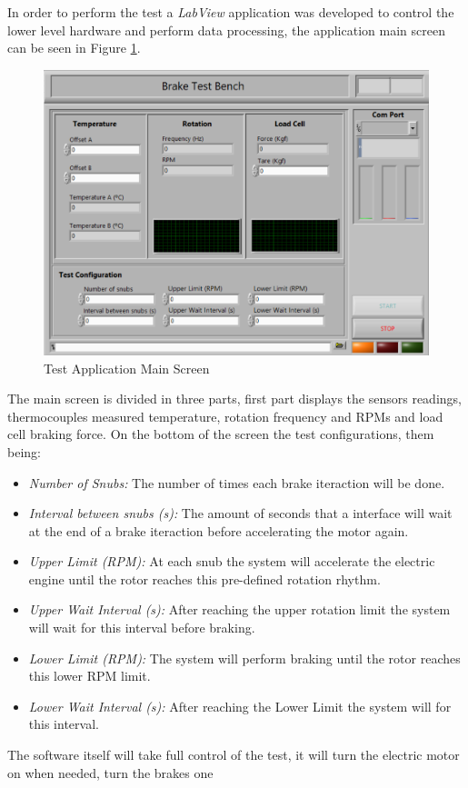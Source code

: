 \label{ssec:testApplication}
	In order to perform the test a \textit{LabView} application was developed to control the lower level hardware and perform data processing, the application main screen can be seen in Figure \ref{fig:labview-app-mainscreen}.

	\begin{figure}[htbp]
		\centering
		\includegraphics[scale=0.7]{figuras/fig-labview-app-mainscreen}
		\caption{Test Application Main Screen}
		\label{fig:labview-app-mainscreen}
	\end{figure}

	The main screen is divided in three parts, first part displays the sensors readings, thermocouples measured temperature, rotation frequency and RPMs and load cell braking force. On the bottom of the screen the test configurations, them being:

	\begin{itemize}Number of Snubs: 
		\item\textit{Number of Snubs:} The number of times each brake iteraction will be done.
		\item\textit{Interval between snubs (s):} The amount of seconds that a interface will wait at the end of a brake iteraction before accelerating the motor again.
		\item\textit{Upper Limit (RPM):} At each snub the system will accelerate the electric engine until the rotor reaches this pre-defined rotation rhythm.
		\item\textit{Upper Wait Interval (s):} After reaching the upper rotation limit the system will wait for this interval before braking.
		\item\textit{Lower Limit (RPM):} The system will perform braking until the rotor reaches this lower RPM limit.
		\item\textit{Lower Wait Interval (s):} After reaching the Lower Limit the system will for this interval.
	\end{itemize}

	The software itself will take full control of the test, it will turn the electric motor on when needed, turn the brakes one